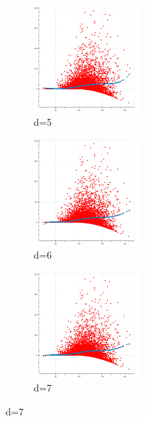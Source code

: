 \documentclass[english,11pt,openany]{report}
\theoremstyle{definition}
\theoremstyle{plain}
\theoremstyle{definition}
\begin{document}
\begin{figure}[H]
	\begin{subfigure}[t]{0.3\textwidth}
		\includegraphics[width=40mm]{lsm/l=5.png}
		\caption{d=5}
		\label{fig:d}
	\end{subfigure}
	\begin{subfigure}[t]{0.3\textwidth}
		\includegraphics[width=40mm]{lsm/l=6.png}
		\caption{d=6}
		\label{fig:c}
	\end{subfigure}	
	\begin{subfigure}[t]{0.3\textwidth}
		\includegraphics[width=40mm]{lsm/l=7.png}
		\caption{d=7}
		\label{fig:d}
	\end{subfigure}


\end{figure}
\end{document}

